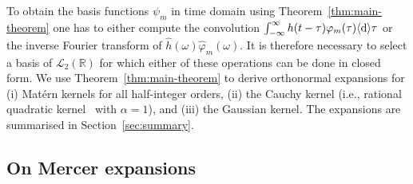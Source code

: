 \documentclass{article}
\newcommand{\mathd}{\mathrm{d}}
\newcommand{\tmcolor}[2]{{\color{#1}{#2}}}
\newcommand{\R}{\mathbb{R}}
\newcommand{\dif}{ \langle \mathd \rangle }
\newcommand{\rev}[1]{\tmcolor{black}{#1}}
\begin{document}
To obtain the basis functions $\psi_m$ in time domain using 
Theorem~\ref{thm:main-theorem} one has to either compute the convolution
$\int_{- \infty}^{\infty} h (t - \tau) \rev{\varphi_m (\tau)} \dif \tau$ or
the inverse Fourier transform of $\hat{h} (\omega)  \hat{\varphi}_m (\omega)$.
It is therefore necessary to select a basis of $\mathscr{L}_2 (\R)$ for which
either of these operations can be done in closed form. We use 
Theorem~\ref{thm:main-theorem} to derive orthonormal expansions for (i)
Mat{\'e}rn kernels for all half-integer orders, (ii) the Cauchy kernel (i.e.,
rational quadratic kernel~{\cite[Equation~(4.19)]{RasmussenWilliams2006}} with
$\alpha = 1$), and (iii) the Gaussian kernel. The expansions are summarised in
Section~\ref{sec:summary}. {\rev{All expansions appearing in this article
converge pointwise.}}

\subsection{On Mercer expansions}
\end{document}
